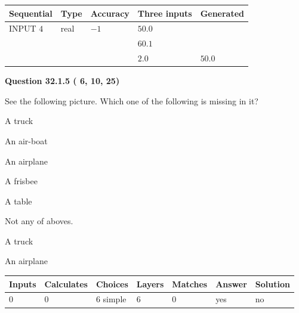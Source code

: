 \documentclass[12pt]{article}
\begin{document}
   
  
  
\noindent\begin{tabular}{|l|l|l|l|l|}
\hline
 Sequential & Type & Accuracy & Three inputs & Generated \\ 
\hline
 
 
  INPUT $           4$ & real & $          -1 $ & $
 50.0
  $ & \\
  & & &  $
 60.1
  $ & \\
  & & &  $
 2.0
 $ & $ 50.0 $ 
 \\  \hline  
 \end{tabular}
   
   
  
\vspace{0.2in}
  
{\textbf{\Large{Question
32.1.5 
 (          6,         10,         25)
}}}
  
  
See the following picture.
Which one of the following is missing in it?
 
 
A truck
 
 
An air-boat
 
 
An airplane
 
 
A frisbee
 
 
A table
 
 
  Not any of aboves.
 
 
\noindent{}
 
 
A truck
 
 
An airplane
 
 
\noindent{}
 
 
 
\vspace{0.3in}
   
   
   
   
\noindent\begin{tabular}{|l|l|l|l|l|l|l|}
 \hline
Inputs & Calculates & Choices & Layers & Matches & Answer & Solution \\ \hline
           0 & 
           0 & 
           6
  simple  
  & 
           6 & 
           0 & 
  yes & 
  no 
  \\ \hline
 \end{tabular}
   
\end{document}
